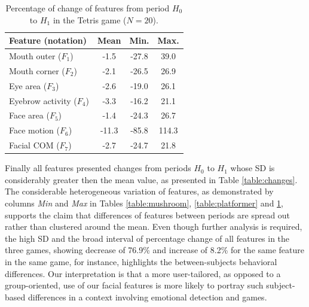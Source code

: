 \begin{table}
    \caption{Percentage of change of features from period $H_0$ to $H_1$ in the Tetris game ($N=20$).}
    \label{table:tetris}
    \centering
    \begin{threeparttable}
        \begin{tabular}{lccc}
            \hline
                \textbf{Feature (notation)} & \textbf{Mean} & \textbf{Min.} & \textbf{Max.} \\
            \hline
                Mouth outer ($F_1$)      & -1.5  & -27.8 & 39.0  \\
                Mouth corner ($F_2$)     & -2.1  & -26.5 & 26.9  \\
            \hline
                Eye area ($F_3$)         & -2.6  & -19.0 & 26.1  \\
                Eyebrow activity ($F_4$) & -3.3  & -16.2 & 21.1  \\
            \hline
                Face area ($F_5$)        & -1.4  & -24.3 & 26.7  \\
                Face motion ($F_6$)      & -11.3 & -85.8 & 114.3 \\
                Facial COM ($F_7$)       & -2.7  & -24.7 & 21.8  \\
            \hline
        \end{tabular}
        \begin{tablenotes}
          \small
          \item[]{}
        \end{tablenotes}
    \end{threeparttable}
\end{table}

Finally all features presented changes from periods $H_0$ to $H_1$ whose SD is considerably greater then the mean value, as presented in Table \ref{table:changes}. The considerable heterogeneous variation of features, as demonstrated by columns \textit{Min} and \textit{Max} in Tables \ref{table:mushroom}, \ref{table:platformer} and \ref{table:tetris}, supports the claim that differences of features between periods are spread out rather than clustered around the mean. Even though further analysis is required, the high SD and the broad interval of percentage change of all features in the three games, showing decrease of 76.9\% and increase of 8.2\% for the same feature in the same game, for instance, highlights the between-subjects behavioral differences. Our interpretation is that a more user-tailored, as opposed to a group-oriented, use of our facial features is more likely to portray such subject-based differences in a context involving emotional detection and games.

